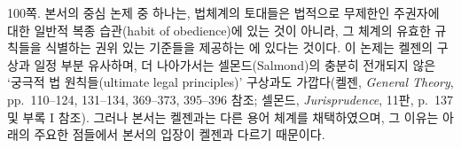 {\footnotesize
\noteentry 100쪽.  본서의 중심 논제 중 하나는, 법체계의 토대들은
법적으로 무제한인 주권자에 대한 일반적 복종 습관(habit of obedience)에
있는 것이 아니라, 그 체계의 유효한 규칙들을 식별하는 권위 있는 기준들을
제공하는 에 있다는
것이다. 이 논제는 켈젠의  구상과 일정 부분
유사하며, 더 나아가서는 셀몬드(Salmond)의 충분히 전개되지 않은 ‘궁극적
법 원칙들(ultimate legal principles)’ 구상과도 가깝다(켈젠,
\emph{General Theory}, pp.~110--124, 131--134, 369--373, 395--396 참조;
셀몬드, \emph{Jurisprudence}, 11판, p.~137 및 부록 I 참조). 그러나
본서는 켈젠과는 다른 용어 체계를 채택하였으며, 그 이유는 아래의 주요한
점들에서 본서의 입장이 켈젠과 다르기 때문이다.

}
